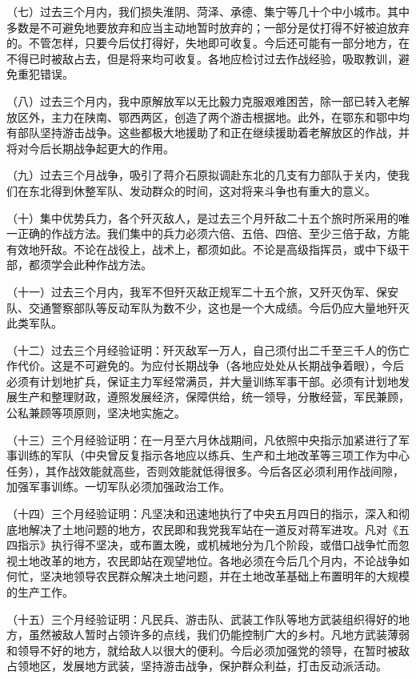 （七）过去三个月内，我们损失淮阴、菏泽、承德、集宁等几十个中小城市。其中多数是不可避免地要放弃和应当主动地暂时放弃的；一部分是仗打得不好被迫放弃的。不管怎样，只要今后仗打得好，失地即可收复。今后还可能有一部分地方，在不得已时被敌占去，但是将来均可收复。各地应检讨过去作战经验，吸取教训，避免重犯错误。

（八）过去三个月内，我中原解放军以无比毅力克服艰难困苦，除一部已转入老解放区外，主力在陕南、鄂西两区，创造了两个游击根据地。此外，在鄂东和鄂中均有部队坚持游击战争。这些都极大地援助了和正在继续援助着老解放区的作战，并将对今后长期战争起更大的作用。

（九）过去三个月战争，吸引了蒋介石原拟调赴东北的几支有力部队于关内，使我们在东北得到休整军队、发动群众的时间，这对将来斗争也有重大的意义。

（十）集中优势兵力，各个歼灭敌人，是过去三个月歼敌二十五个旅时所采用的唯一正确的作战方法。我们集中的兵力必须六倍、五倍、四倍、至少三倍于敌，方能有效地歼敌。不论在战役上，战术上，都须如此。不论是高级指挥员，或中下级干部，都须学会此种作战方法。

（十一）过去三个月内，我军不但歼灭敌正规军二十五个旅，又歼灭伪军、保安队、交通警察部队等反动军队为数不少，这也是一个大成绩。今后仍应大量地歼灭此类军队。

（十二）过去三个月经验证明：歼灭敌军一万人，自己须付出二千至三千人的伤亡作代价。这是不可避免的。为应付长期战争（各地应处处从长期战争着眼），今后必须有计划地扩兵，保证主力军经常满员，并大量训练军事干部。必须有计划地发展生产和整理财政，遵照发展经济，保障供给，统一领导，分散经营，军民兼顾，公私兼顾等项原则，坚决地实施之。

（十三）三个月经验证明：在一月至六月休战期间，凡依照中央指示加紧进行了军事训练的军队（中央曾反复指示各地应以练兵、生产和土地改革等三项工作为中心任务），其作战效能就高些，否则效能就低得很多。今后各区必须利用作战间隙，加强军事训练。一切军队必须加强政治工作。

（十四）三个月经验证明：凡坚决和迅速地执行了中央五月四日的指示，深入和彻底地解决了土地问题的地方，农民即和我党我军站在一道反对蒋军进攻。凡对《五四指示》执行得不坚决，或布置太晚，或机械地分为几个阶段，或借口战争忙而忽视土地改革的地方，农民即站在观望地位。各地必须在今后几个月内，不论战争如何忙，坚决地领导农民群众解决土地问题，并在土地改革基础上布置明年的大规模的生产工作。

（十五）三个月经验证明：凡民兵、游击队、武装工作队等地方武装组织得好的地方，虽然被敌人暂时占领许多的点线，我们仍能控制广大的乡村。凡地方武装薄弱和领导不好的地方，就给敌人以很大的便利。今后必须加强党的领导，在暂时被敌占领地区，发展地方武装，坚持游击战争，保护群众利益，打击反动派活动。

